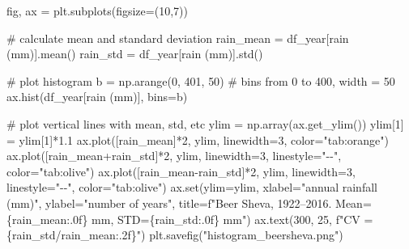 \documentclass[
  letterpaper,
  DIV=11,
  numbers=noendperiod]{scrreprt}
\newenvironment{Shaded}{\begin{snugshade}}{\end{snugshade}}
\newcommand{\BuiltInTok}[1]{\textcolor[rgb]{0.00,0.23,0.31}{#1}}
\newcommand{\CommentTok}[1]{\textcolor[rgb]{0.37,0.37,0.37}{#1}}
\newcommand{\DecValTok}[1]{\textcolor[rgb]{0.68,0.00,0.00}{#1}}
\newcommand{\FloatTok}[1]{\textcolor[rgb]{0.68,0.00,0.00}{#1}}
\newcommand{\NormalTok}[1]{\textcolor[rgb]{0.00,0.23,0.31}{#1}}
\newcommand{\OperatorTok}[1]{\textcolor[rgb]{0.37,0.37,0.37}{#1}}
\newcommand{\SpecialCharTok}[1]{\textcolor[rgb]{0.37,0.37,0.37}{#1}}
\newcommand{\SpecialStringTok}[1]{\textcolor[rgb]{0.13,0.47,0.30}{#1}}
\newcommand{\StringTok}[1]{\textcolor[rgb]{0.13,0.47,0.30}{#1}}
\begin{document}
\begin{Shaded}
\begin{Highlighting}[]
\NormalTok{fig, ax }\OperatorTok{=}\NormalTok{ plt.subplots(figsize}\OperatorTok{=}\NormalTok{(}\DecValTok{10}\NormalTok{,}\DecValTok{7}\NormalTok{))}

\CommentTok{\# calculate mean and standard deviation}
\NormalTok{rain\_mean }\OperatorTok{=}\NormalTok{ df\_year[}\StringTok{\textquotesingle{}rain (mm)\textquotesingle{}}\NormalTok{].mean()}
\NormalTok{rain\_std }\OperatorTok{=}\NormalTok{ df\_year[}\StringTok{\textquotesingle{}rain (mm)\textquotesingle{}}\NormalTok{].std()}

\CommentTok{\# plot histogram}
\NormalTok{b }\OperatorTok{=}\NormalTok{ np.arange(}\DecValTok{0}\NormalTok{, }\DecValTok{401}\NormalTok{, }\DecValTok{50}\NormalTok{)  }\CommentTok{\# bins from 0 to 400, width = 50}
\NormalTok{ax.hist(df\_year[}\StringTok{\textquotesingle{}rain (mm)\textquotesingle{}}\NormalTok{], bins}\OperatorTok{=}\NormalTok{b)}

\CommentTok{\# plot vertical lines with mean, std, etc}
\NormalTok{ylim }\OperatorTok{=}\NormalTok{ np.array(ax.get\_ylim())}
\NormalTok{ylim[}\DecValTok{1}\NormalTok{] }\OperatorTok{=}\NormalTok{ ylim[}\DecValTok{1}\NormalTok{]}\OperatorTok{*}\FloatTok{1.1}
\NormalTok{ax.plot([rain\_mean]}\OperatorTok{*}\DecValTok{2}\NormalTok{, ylim, linewidth}\OperatorTok{=}\DecValTok{3}\NormalTok{, color}\OperatorTok{=}\StringTok{"tab:orange"}\NormalTok{)}
\NormalTok{ax.plot([rain\_mean}\OperatorTok{+}\NormalTok{rain\_std]}\OperatorTok{*}\DecValTok{2}\NormalTok{, ylim, linewidth}\OperatorTok{=}\DecValTok{3}\NormalTok{, linestyle}\OperatorTok{=}\StringTok{"{-}{-}"}\NormalTok{, color}\OperatorTok{=}\StringTok{"tab:olive"}\NormalTok{)}
\NormalTok{ax.plot([rain\_mean}\OperatorTok{{-}}\NormalTok{rain\_std]}\OperatorTok{*}\DecValTok{2}\NormalTok{, ylim, linewidth}\OperatorTok{=}\DecValTok{3}\NormalTok{, linestyle}\OperatorTok{=}\StringTok{"{-}{-}"}\NormalTok{, color}\OperatorTok{=}\StringTok{"tab:olive"}\NormalTok{)}
\NormalTok{ax.}\BuiltInTok{set}\NormalTok{(ylim}\OperatorTok{=}\NormalTok{ylim,}
\NormalTok{       xlabel}\OperatorTok{=}\StringTok{"annual rainfall (mm)"}\NormalTok{,}
\NormalTok{       ylabel}\OperatorTok{=}\StringTok{"number of years"}\NormalTok{,}
\NormalTok{       title}\OperatorTok{=}\SpecialStringTok{f"Beer Sheva, 1922–2016. Mean=}\SpecialCharTok{\{}\NormalTok{rain\_mean}\SpecialCharTok{:.0f\}}\SpecialStringTok{ mm, STD=}\SpecialCharTok{\{}\NormalTok{rain\_std}\SpecialCharTok{:.0f\}}\SpecialStringTok{ mm"}\NormalTok{)}
\NormalTok{ax.text(}\DecValTok{300}\NormalTok{, }\DecValTok{25}\NormalTok{, }\SpecialStringTok{f"CV = }\SpecialCharTok{\{}\NormalTok{rain\_std}\OperatorTok{/}\NormalTok{rain\_mean}\SpecialCharTok{:.2f\}}\SpecialStringTok{"}\NormalTok{)}
\NormalTok{plt.savefig(}\StringTok{"histogram\_beersheva.png"}\NormalTok{)}
\end{Highlighting}
\end{Shaded}
\end{document}
